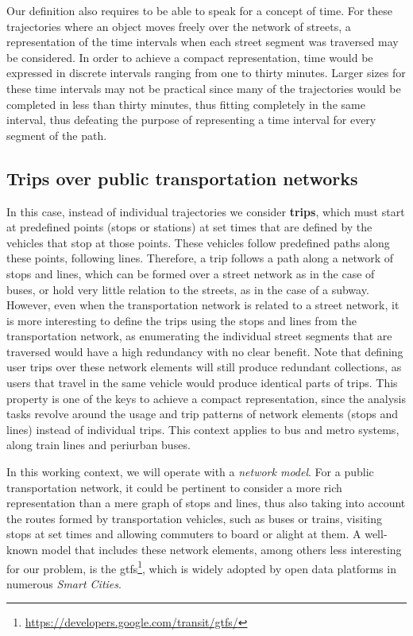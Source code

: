 \documentclass[a4paper,10pt,twoside]{book}
\begin{document}
    Our definition also requires to be able to speak for a concept of time. 
	For these trajectories where an object moves freely over the network of streets, a representation of the time intervals when each street segment was traversed may be considered. In order to achieve a compact representation, time would be expressed in discrete intervals ranging from one to thirty minutes. Larger sizes for these time intervals may not be practical since many of the trajectories would be completed in less than thirty minutes, thus fitting completely in the same interval, thus defeating the purpose of representing a time interval for every segment of the path.
	
	\subsection{Trips over public transportation networks}
	In this case, instead of individual trajectories we consider \textbf{trips}, which must start at predefined points (stops or stations) at set times that are defined by the vehicles that stop at those points. These vehicles follow predefined paths along these points, following lines.
    Therefore, a trip follows a path along a network of stops and lines, which can be formed over a street network as in the case of buses, or hold very little relation to the streets, as in the case of a subway. However, even when the transportation network is related to a street network, it is more interesting to define the trips using the stops and lines from the transportation network, as enumerating the individual street segments that are traversed would have a high redundancy with no clear benefit.
    Note that defining user trips over these network elements will still produce redundant collections, as users that travel in the same vehicle would produce identical parts of trips. This property is one of the keys to achieve a compact representation, since the analysis tasks revolve around the usage and trip patterns of network elements (stops and lines) instead of individual trips.
    This context applies to bus and metro systems, along train lines and periurban buses.
	
	In this working context, we will operate with a \textit{network model}. 
	For a public transportation network, it could be pertinent to consider a more rich representation than a mere graph of stops and lines, thus also taking into account the routes formed by transportation vehicles, such as buses or trains, visiting stops at set times and allowing commuters to board or alight at them. A well-known model that includes these network elements, among others less interesting for our problem, is the \gls{gtfs}\footnote{\url{https://developers.google.com/transit/gtfs/}}, which is widely adopted by open data platforms in numerous \textit{Smart Cities}.
	
\end{document}
